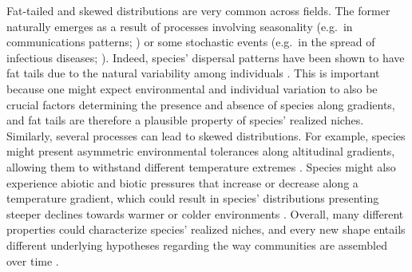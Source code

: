 \documentclass[11pt, a4paper]{article}
\begin{document}
Fat-tailed and skewed distributions are very common across fields. The former naturally emerges as a result of processes involving seasonality (e.g.~in communications patterns; \citealt{malmgrenPoissonianExplanationHeavy2008}) or some stochastic events (e.g.~in the spread of infectious diseases; \citealt{wongEvidenceThatCoronavirus2020}). Indeed, species' dispersal patterns have been shown to have fat tails due to the natural variability among individuals \citep{petrovskiiDispersalStatisticallyStructured2009}. This is important because one might expect environmental and individual variation to also be crucial factors determining the presence and absence of species along gradients, and fat tails are therefore a plausible property of species' realized niches. Similarly, several processes can lead to skewed distributions. For example, species might present asymmetric environmental tolerances along altitudinal gradients, allowing them to withstand different temperature extremes \citep{sundayGlobalAnalysisThermal2011}. Species might also experience abiotic and biotic pressures that increase or decrease along a temperature gradient, which could result in species' distributions presenting steeper declines towards warmer or colder environments \citep{normandImportanceAbioticStress2009}. Overall, many different properties could characterize species' realized niches, and every new shape entails different underlying hypotheses regarding the way communities are assembled over time \citep{damenSpatialPredictionsCommunity2017}.
\end{document}
